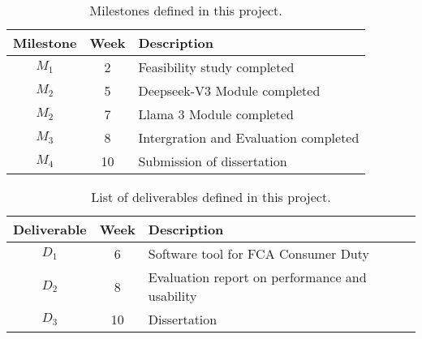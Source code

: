 \documentclass[a4paper,11pt]{article}
\begin{document}
\begin{table}[htbp]
    \begin{center}
        \begin{tabular}{|c|c|l|}
        \hline
        \textbf{Milestone} & \textbf{Week} & \textbf{Description} \\
        \hline
        $M_1$ & 2 & Feasibility study completed \\
        $M_2$ & 5 & Deepseek-V3 Module completed \\
        $M_2$ & 7 & Llama 3 Module completed \\
        $M_3$ & 8 & Intergration and Evaluation completed \\
        $M_4$ & 10 & Submission of dissertation \\
        \hline
        \end{tabular} 
    \end{center}
    \caption{Milestones defined in this project.}
    \label{fig:milestones}
\end{table}

\begin{table}[htbp]
    \begin{center}
        \begin{tabular}{|c|c|l|}
        \hline
        \textbf{Deliverable} & \textbf{Week} & \textbf{Description} \\
        \hline
        $D_1$ & 6 & Software tool for FCA Consumer Duty \\
        $D_2$ & 8 & Evaluation report on performance and usability \\
        $D_3$ & 10 & Dissertation \\
        \hline
        \end{tabular} 
    \end{center}
    \caption{List of deliverables defined in this project.}
    \label{fig:deliverables}
\end{table}



{\small
}
\end{document}

